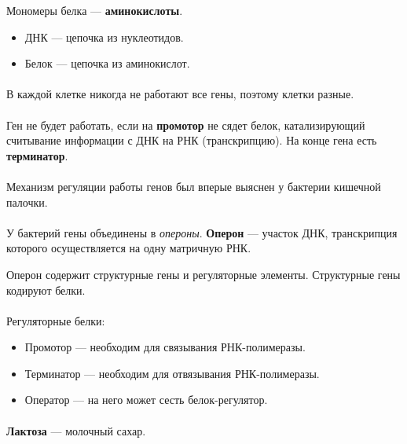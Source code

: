 \documentclass[dvipdfmx]{article}
\begin{document}
Мономеры белка --- \textbf{аминокислоты}.

\begin{itemize}
\item
  ДНК --- цепочка из нуклеотидов.
\item
  Белок --- цепочка из аминокислот.
\end{itemize}

\paragraph{}
В каждой клетке никогда не работают все гены, поэтому клетки разные.

\paragraph{}
Ген не будет работать, если на \textbf{промотор} не сядет белок, катализирующий считывание информации с
ДНК на РНК (транскрипцию). На конце гена есть \textbf{терминатор}.

\paragraph{}
Механизм регуляции работы генов был вперые выяснен у бактерии кишечной палочки.

\paragraph{}

У бактерий гены объединены в \textit{опероны}.
\textbf{Оперон} --- участок ДНК, транскрипция которого осуществляется на одну матричную РНК.

Оперон содержит структурные гены и регуляторные элементы.
Структурные гены кодируют белки.

\paragraph{}
Регуляторные белки:
\begin{itemize}
\item
  Промотор --- необходим для связывания РНК-полимеразы.
\item
  Терминатор --- необходим для отвязывания РНК-полимеразы.
\item
  Оператор --- на него может сесть белок-регулятор.
\end{itemize}
\paragraph{}
\textbf{Лактоза} --- молочный сахар.
\end{document}
